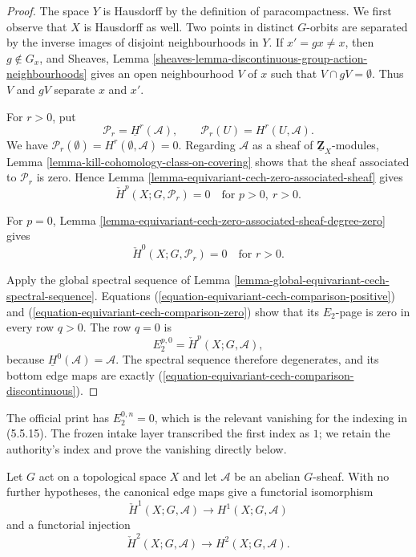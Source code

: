 \begin{proof}
The space $Y$ is Hausdorff by the definition of paracompactness. We first
observe that $X$ is Hausdorff as well. Two points in distinct $G$-orbits
are separated by the inverse images of disjoint neighbourhoods in $Y$.
If $x' = gx\neq x$, then $g\notin G_x$, and Sheaves, Lemma
\ref{sheaves-lemma-discontinuous-group-action-neighbourhoods} gives an
open neighbourhood $V$ of $x$ such that $V\cap gV=\emptyset$. Thus $V$
and $gV$ separate $x$ and $x'$.

For $r>0$, put
$$
\mathcal P_r=\underline H^r(\mathcal A),
\qquad
\mathcal P_r(U)=H^r(U,\mathcal A).
$$
We have $\mathcal P_r(\emptyset)=H^r(\emptyset,\mathcal A)=0$.
Regarding $\mathcal A$ as a sheaf of $\underline{\mathbf Z}_X$-modules,
Lemma \ref{lemma-kill-cohomology-class-on-covering} shows that the sheaf
associated to $\mathcal P_r$ is zero. Hence Lemma
\ref{lemma-equivariant-cech-zero-associated-sheaf} gives
\begin{equation}
\label{equation-equivariant-cech-comparison-positive}
\check H^p(X;G,\mathcal P_r)=0
\quad\text{for }p>0,\ r>0.
\end{equation}

For $p=0$, Lemma
\ref{lemma-equivariant-cech-zero-associated-sheaf-degree-zero} gives
\begin{equation}
\label{equation-equivariant-cech-comparison-zero}
\check H^0(X;G,\mathcal P_r)=0
\quad\text{for }r>0.
\end{equation}

Apply the global spectral sequence of Lemma
\ref{lemma-global-equivariant-cech-spectral-sequence}. Equations
(\ref{equation-equivariant-cech-comparison-positive}) and
(\ref{equation-equivariant-cech-comparison-zero}) show that its
$E_2$-page is zero in every row $q>0$. The row $q=0$ is
$$
E_2^{p,0}=\check H^p(X;G,\mathcal A),
$$
because $\underline H^0(\mathcal A)=\mathcal A$. The spectral sequence
therefore degenerates, and its bottom edge maps are exactly
(\ref{equation-equivariant-cech-comparison-discontinuous}).
\end{proof}

\begin{lemma}
\label{lemma-equivariant-cech-comparison-low-degree}
\begin{reference}
\cite[Chapter V, \S 5.5, Remarks II, p. 213]{Tohoku}
\end{reference}
\begin{history}
The official print has ${E_2^{0,n}=0}$, which is the relevant vanishing
for the indexing in (5.5.15). The frozen intake layer transcribed the
first index as $1$; we retain the authority's index and prove the
vanishing directly below.
\end{history}
Let $G$ act on a topological space $X$ and let $\mathcal A$ be an abelian
$G$-sheaf. With no further hypotheses, the canonical edge maps give a
functorial isomorphism
$$
\check H^1(X;G,\mathcal A)
\longrightarrow H^1(X;G,\mathcal A)
$$
and a functorial injection
$$
\check H^2(X;G,\mathcal A)
\longrightarrow H^2(X;G,\mathcal A).
$$
\end{lemma}

